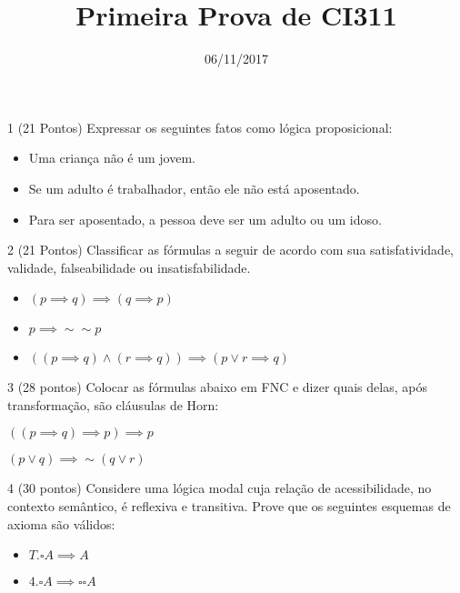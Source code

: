 \documentclass[a4paper,10pt]{article}
\title{Primeira Prova de CI311}
\author{}
\date{06/11/2017}
\begin{document}
\maketitle



1 (21 Pontos) Expressar os seguintes fatos como lógica proposicional:
\begin{itemize}
 \item Uma criança não é um jovem.
 \item Se um adulto é trabalhador, então ele não está aposentado.
 \item Para ser aposentado, a pessoa deve ser um adulto ou um idoso.
\end{itemize}

2 (21 Pontos) Classificar as fórmulas a seguir de acordo com sua satisfatividade, validade, falseabilidade ou insatisfabilidade.
\begin{itemize}
 \item $ (p \implies q) \implies (q \implies p) $
 \item $ p \implies \sim \sim p $
 \item $ ((p \implies q) \wedge (r \implies q)) \implies (p \vee r \implies q) $
\end{itemize}

3 (28 pontos) Colocar as fórmulas abaixo em FNC e dizer quais delas, após transformação, são cláusulas de Horn:

$ ((p \implies q) \implies p ) \implies p $

$ (p \vee q) \implies \sim (q \vee r) $

4 (30 pontos) Considere uma lógica modal cuja relação de acessibilidade, no contexto semântico, é reflexiva e transitiva. Prove que os seguintes esquemas de axioma são válidos:
\begin{itemize}
 \item $ T. \square A \implies A $
 \item $ 4. \square A \implies \square \square A $
\end{itemize}
\end{document}
